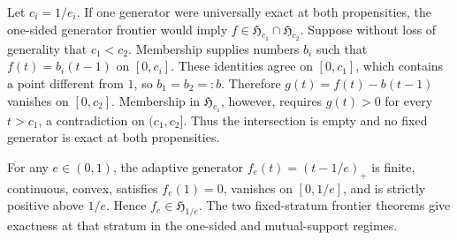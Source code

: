 Let \(c_i=1/e_i\).  If one generator were universally exact at both propensities, the one-sided generator frontier would imply \(f\in\mathfrak H_{c_1}\cap\mathfrak H_{c_2}\).  Suppose without loss of generality that \(c_1<c_2\).  Membership supplies numbers \(b_i\) such that \(f(t)=b_i(t-1)\) on \([0,c_i]\).  These identities agree on \([0,c_1]\), which contains a point different from \(1\), so \(b_1=b_2=:b\).  Therefore \(g(t)=f(t)-b(t-1)\) vanishes on \([0,c_2]\).  Membership in \(\mathfrak H_{c_1}\), however, requires \(g(t)>0\) for every \(t>c_1\), a contradiction on \((c_1,c_2]\).  Thus the intersection is empty and no fixed generator is exact at both propensities.

For any \(e\in(0,1)\), the adaptive generator \(f_e(t)=(t-1/e)_+\) is finite, continuous, convex, satisfies \(f_e(1)=0\), vanishes on \([0,1/e]\), and is strictly positive above \(1/e\).  Hence \(f_e\in\mathfrak H_{1/e}\).  The two fixed-stratum frontier theorems give exactness at that stratum in the one-sided and mutual-support regimes.
